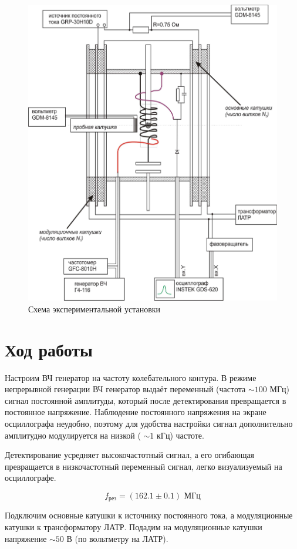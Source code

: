 \documentclass[a4paper, 12pt]{article}
\begin{document}
        \begin{figure}[H]
            \centering
            \includegraphics[width = 0.75\linewidth]{img/setup.png}
            \caption{Схема экспериментальной установки}
            \label{}
        \end{figure}


        \newpage
    \section{Ход работы}

        Настроим ВЧ генератор на частоту колебательного контура. В режиме непрерывной генерации ВЧ генератор выдаёт переменный (частота  $\sim  100$ МГц) сигнал постоянной амплитуды, который после детектирования превращается в постоянное напряжение. Наблюдение постоянного напряжения на экране осциллографа неудобно, поэтому для удобства настройки сигнал дополнительно амплитудно модулируется на низкой ( $\sim  1$ кГц) частоте.

        Детектирование усредняет высокочастотный сигнал, а его огибающая превращается в низкочастотный переменный сигнал, легко визуализуемый на осциллографе.

        \[ f_{\text{рез}} = (162.1 \pm 0.1) \text{ МГц} \]

        Подключим основные катушки к источнику постоянного тока, а модуляционные катушки к трансформатору ЛАТР. Подадим на модуляционные катушки напряжение  $\sim 50$ В (по вольтметру на ЛАТР).
\end{document}
